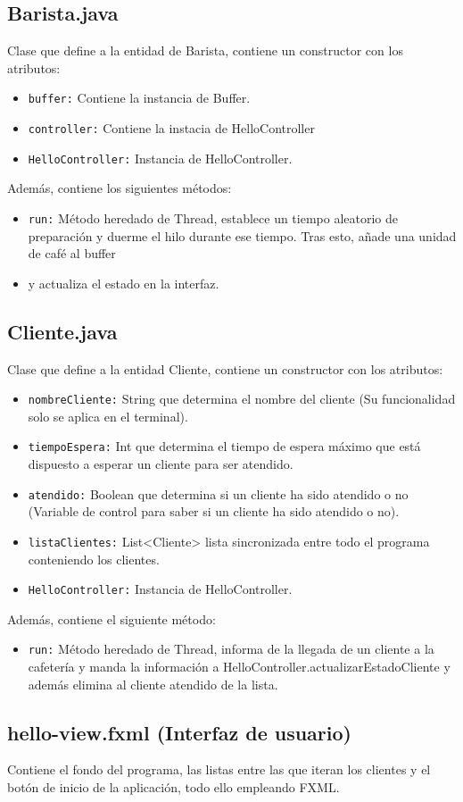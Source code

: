 \documentclass[a4paper,12pt]{article}
\begin{document}
    \subsection{Barista.java}
    Clase que define a la entidad de Barista, contiene un constructor con los atributos:
    \begin{itemize}
        \item \texttt{buffer:} Contiene la instancia de Buffer.
        \item \texttt{controller:} Contiene la instacia de HelloController
        \item \texttt{HelloController:} Instancia de HelloController.
    \end{itemize}
    Además, contiene los siguientes métodos:
    \begin{itemize}
        \item \texttt{run:} Método heredado de Thread, establece un tiempo aleatorio de preparación y duerme el hilo durante ese tiempo. Tras esto, añade una unidad de café al buffer
        \item y actualiza el estado en la interfaz.
    \end{itemize}
    
    \subsection{Cliente.java} 
    Clase que define a la entidad Cliente, contiene un constructor con los atributos:
    \begin{itemize}
        \item \texttt{nombreCliente:} String que determina el nombre del cliente (Su funcionalidad solo se aplica en el terminal).
        \item \texttt{tiempoEspera:} Int que determina el tiempo de espera máximo que está dispuesto a esperar un cliente para ser atendido.
        \item \texttt{atendido:} Boolean que determina si un cliente ha sido atendido o no (Variable de control para saber si un cliente ha sido atendido o no).
        \item \texttt{listaClientes:} List<Cliente> lista sincronizada entre todo el programa conteniendo los clientes.
        \item \texttt{HelloController:} Instancia de HelloController.
    \end{itemize}
    Además, contiene el siguiente método:
    \begin{itemize}
        \item \texttt{run:} Método heredado de Thread, informa de la llegada de un cliente a la cafetería y manda la información a HelloController.actualizarEstadoCliente
        y además elimina al cliente atendido de la lista.
    \end{itemize}
    \subsection{hello-view.fxml (Interfaz de usuario)}
    Contiene el fondo del programa, las listas entre las que iteran los clientes y el botón de inicio de la aplicación, todo ello empleando FXML.
\end{document}
